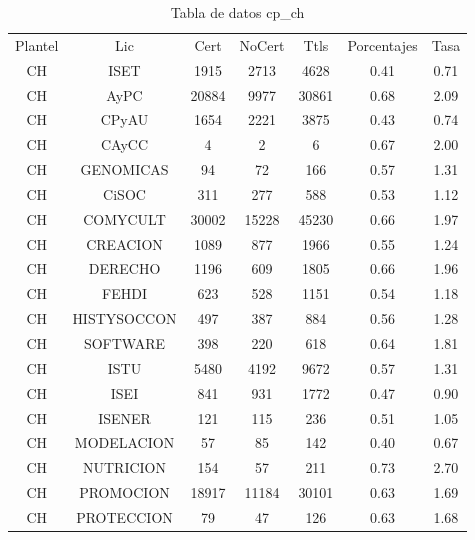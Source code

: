 \documentclass{article}
\begin{document}
\begin{table}[h]
\centering
\begin{tabular}{ccccccc}

Plantel & Lic & Cert & NoCert & Ttls & Porcentajes & Tasa \\

CH & ISET & 1915 & 2713 & 4628 & 0.41 & 0.71 \\
CH & AyPC & 20884 & 9977 & 30861 & 0.68 & 2.09 \\
CH & CPyAU & 1654 & 2221 & 3875 & 0.43 & 0.74 \\
CH & CAyCC & 4 & 2 & 6 & 0.67 & 2.00 \\
CH & GENOMICAS & 94 & 72 & 166 & 0.57 & 1.31 \\
CH & CiSOC & 311 & 277 & 588 & 0.53 & 1.12 \\
CH & COMYCULT & 30002 & 15228 & 45230 & 0.66 & 1.97 \\
CH & CREACION & 1089 & 877 & 1966 & 0.55 & 1.24 \\
CH & DERECHO & 1196 & 609 & 1805 & 0.66 & 1.96 \\
CH & FEHDI & 623 & 528 & 1151 & 0.54 & 1.18 \\
CH & HISTYSOCCON & 497 & 387 & 884 & 0.56 & 1.28 \\
CH & SOFTWARE & 398 & 220 & 618 & 0.64 & 1.81 \\
CH & ISTU & 5480 & 4192 & 9672 & 0.57 & 1.31 \\
CH & ISEI & 841 & 931 & 1772 & 0.47 & 0.90 \\
CH & ISENER & 121 & 115 & 236 & 0.51 & 1.05 \\
CH & MODELACION & 57 & 85 & 142 & 0.40 & 0.67 \\
CH & NUTRICION & 154 & 57 & 211 & 0.73 & 2.70 \\
CH & PROMOCION & 18917 & 11184 & 30101 & 0.63 & 1.69 \\
CH & PROTECCION & 79 & 47 & 126 & 0.63 & 1.68 \\

\end{tabular}
\caption{Tabla de datos cp\_ch}
\end{table}
\end{document}

